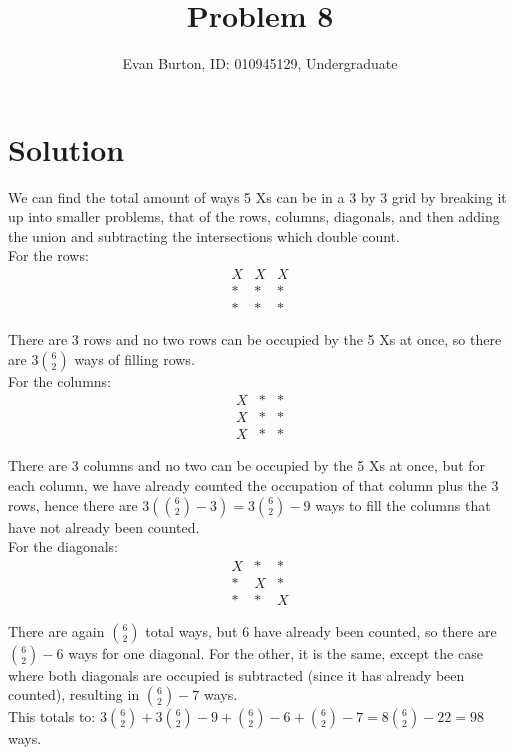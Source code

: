 \documentclass[]{article}
\title{Problem 8}
\author{Evan Burton, ID: 010945129, Undergraduate}
\begin{document}
\maketitle

\section{Solution}

We can find the total amount of ways 5 Xs can be in a 3 by 3 grid by breaking it up into smaller problems, that of the rows, columns, diagonals, and then adding the union and subtracting the intersections which double count.\\

For the rows:
$$
\begin{array}{ccc}
	X & X & X \\ 
	\ast & * & * \\ 
	\ast & * & *
\end{array} 
$$

There are 3 rows and no two rows can be occupied by the 5 Xs at once, so there are $3{6\choose2}$ ways of filling rows.\\

For the columns:
$$
\begin{array}{ccc}
X & * & * \\ 
X & * & * \\ 
X & * & *
\end{array} 
$$

There are 3 columns and no two can be occupied by the 5 Xs at once, but for each column, we have already counted the occupation of that column plus the 3 rows, hence there are $3({6\choose 2} - 3) = 3{6\choose 2} - 9$ ways to fill the columns that have not already been counted.\\

For the diagonals:
$$
\begin{array}{ccc}
X & * & * \\ 
\ast & X & * \\ 
\ast & * & X
\end{array} 
$$

There are again ${6\choose 2}$ total ways, but 6 have already been counted, so there are ${6\choose 2} - 6$ ways for one diagonal. For the other, it is the same, except the case where both diagonals are occupied is subtracted (since it has already been counted), resulting in ${6\choose 2} - 7$ ways.\\

This totals to: $3{6\choose 2} + 3{6\choose 2} - 9 + {6\choose 2}-6+{6\choose 2}-7 = 8{6\choose 2} - 22 = 98$ ways.
\end{document}
